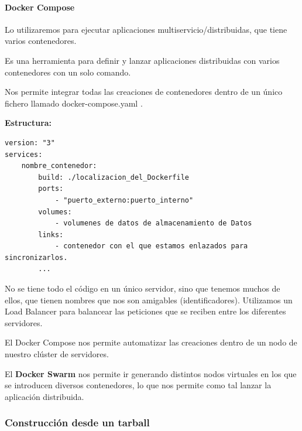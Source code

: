 \documentclass[12pt, twoside, openright]{report} %
\begin{document}
\paragraph{Docker Compose}

Lo utilizaremos para ejecutar aplicaciones multiservicio/distribuidas, que tiene varios contenedores.

Es una herramienta para definir y lanzar aplicaciones distribuidas con varios contenedores con un solo comando.

Nos permite integrar todas las creaciones de contenedores dentro de un único fichero llamado docker-compose.yaml .

\textbf{Estructura:}
\begin{lstlisting}
version: "3"
services:
	nombre_contenedor:
		build: ./localizacion_del_Dockerfile
		ports:
			- "puerto_externo:puerto_interno"
		volumes:
			- volumenes de datos de almacenamiento de Datos
		links:
			- contenedor con el que estamos enlazados para sincronizarlos.
		...
\end{lstlisting}

No se tiene todo el código en un único servidor, sino que tenemos muchos de ellos, que tienen nombres que nos son amigables (identificadores).
Utilizamos un Load Balancer para balancear las peticiones que se reciben entre los diferentes servidores.

El Docker Compose nos permite automatizar las creaciones dentro de un nodo de nuestro clúster de servidores.

El \textbf{Docker Swarm} nos permite ir generando distintos nodos virtuales en los que se introducen diversos contenedores, lo que nos permite como tal lanzar la aplicación distribuida.

\subsubsection{Construcción desde un tarball}
\end{document}

